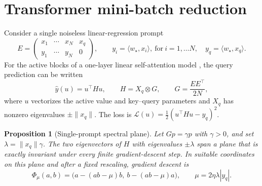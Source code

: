 \documentclass[11pt]{article}
\newtheorem{proposition}[theorem]{Proposition}
\begin{document}

\section{Transformer mini-batch reduction}
\label{sec:reduction}

Consider a single noiseless linear-regression prompt
\[
E=
\begin{pmatrix}
x_1&\cdots&x_N&x_q\\
y_1&\cdots&y_N&0
\end{pmatrix},
\qquad y_i=\langle w_\star,x_i\rangle,~\text{for}~i=1,\ldots N, \quad
y_q=\langle w_\star,x_q\rangle.
\]
For the active blocks of a one-layer linear self-attention model
\citep{zhang2024trained}, the query prediction can be written
\[
    \widehat y(u)=u^\top H u,
    \qquad
    H=X_q\otimes G,\qquad
    G=\frac{EE^\top}{2N},
\]
where \(u\) vectorizes the active value and key--query parameters and \(X_q\)
has nonzero eigenvalues \(\pm\|x_q\|\).  The loss is
\(\mathcal L(u)=\frac12(u^\top Hu-y_q)^2\).

\begin{proposition}[Single-prompt spectral plane]
\label{prop:transformer-reduction}
Let \(Gp=\gamma p\) with \(\gamma>0\), and set
\(\lambda=\|x_q\|\gamma\).  The two eigenvectors of \(H\) with eigenvalues
\(\pm\lambda\) span a plane that is exactly invariant under every finite
gradient-descent step.  In suitable coordinates on this plane and after a
fixed rescaling, gradient descent is
\begin{equation}
\label{eq:phi}
    \Phi_\mu(a,b)
    =
    \bigl(a-(ab-\mu)b,\ b-(ab-\mu)a\bigr),
    \qquad
    \mu=2\eta\lambda|y_q|.
\end{equation}
\end{proposition}
\end{document}
